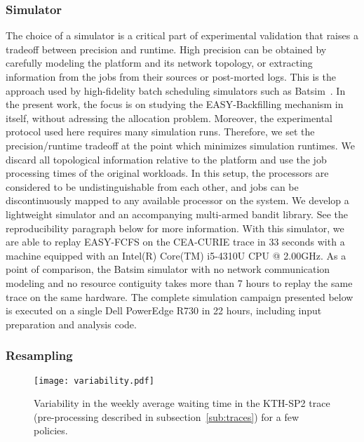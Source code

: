 \documentclass[sigconf]{acmart}
\begin{document}
\subsubsection{Simulator}

The choice of a simulator is a critical part of experimental validation that
raises a tradeoff between precision and runtime. High precision can be obtained
by carefully modeling the platform and its network topology, or extracting
information from the jobs from their sources or post-morted logs. This is the
approach used by high-fidelity batch scheduling simulators such as
Batsim~\cite{batsim}. In the present work, the focus is on studying the
EASY-Backfilling mechanism in itself, without adressing the allocation problem.
Moreover, the experimental protocol used here requires many simulation runs.
Therefore, we set the precision/runtime tradeoff at the point which minimizes
simulation runtimes. We discard all topological information relative to the
platform and use the job processing times of the original workloads. In this
setup, the processors are considered to be undistinguishable from each other,
and jobs can be discontinuously mapped to any available processor on the
system. We develop a lightweight simulator\cite{ocst} and an accompanying
multi-armed bandit library\cite{obandit}. See the reproducibility paragraph
below for more information.  With this simulator, we are able to replay
EASY-FCFS on the CEA-CURIE trace in 33 seconds with a machine equipped with an
Intel(R) Core(TM) i5-4310U CPU @ 2.00GHz. As a point of comparison, the Batsim
simulator with no network communication modeling and no resource contiguity
takes more than 7 hours to replay the same trace on the same hardware. The complete
simulation campaign presented below is executed on a single Dell PowerEdge R730 in 22
hours, including input preparation and analysis code.

\subsubsection{Resampling}

\begin{figure*}[ht]
  \centering
  \texttt{[image: variability.pdf]}
  \caption{Variability in the weekly average waiting time in the KTH-SP2 trace (pre-processing described in subsection~\ref{sub:traces}) for a few policies.}
  \label{fig:mosn}
\end{figure*}

\end{document}
